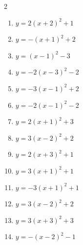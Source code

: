 \documentclass[b5paper,10pt]{ltjsarticle}
\begin{document}
\begin{multicols}{ 2 }
\begin{enumerate}
\vspace{170pt}\item $\displaystyle{} y= 2\left( x+2\right)^{2}+1$

\vspace{170pt}\item $\displaystyle{} y= -\left( x+1\right)^{2}+2$

\vspace{170pt}\item $\displaystyle{} y= \left( x-1\right)^{2}-3$

\vspace{170pt}\item $\displaystyle{} y= -2\left( x-3\right)^{2}-2$

\vspace{170pt}\item $\displaystyle{} y= -3\left( x-1\right)^{2}+2$

\vspace{170pt}\item $\displaystyle{} y= -2\left( x-1\right)^{2}-2$

\vspace{170pt}\item $\displaystyle{} y= 2\left( x+1\right)^{2}+3$

\vspace{170pt}\item $\displaystyle{} y= 3\left( x-2\right)^{2}+2$

\vspace{170pt}\item $\displaystyle{} y= 2\left( x+3\right)^{2}+1$

\vspace{170pt}\item $\displaystyle{} y= 3\left( x+1\right)^{2}+1$

\vspace{170pt}\item $\displaystyle{} y= -3\left( x+1\right)^{2}+1$

\vspace{170pt}\item $\displaystyle{} y= 3\left( x-2\right)^{2}+2$

\vspace{170pt}\item $\displaystyle{} y= 3\left( x+3\right)^{2}+3$

\vspace{170pt}\item $\displaystyle{} y= -\left( x-2\right)^{2}-1$


\end{enumerate}
\end{multicols}
\end{document}
